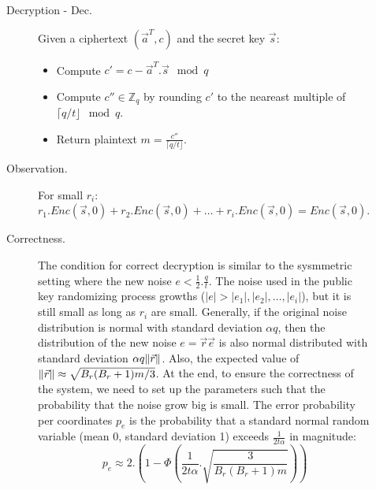\begin{description}
\begin{description}
\[                    \]
                \item [Decryption - Dec.] Given a ciphertext $(\vec{a}^T, c)$
                    and the secret key $\vec{s}$:
                    \begin{itemize}
                        \item Compute $c' = c - \vec{a}^T . \vec{s} \mod q$
                        \item Compute $c''  \in \mathbb{Z}_q$ by rounding
                            $c'$ to the neareast multiple of $\lceil q/t
                            \rfloor \mod q$.
                        \item Return plaintext $m = \frac{c''}{\lceil q/t
                            \rfloor}$.
                    \end{itemize}
                \item [Observation.] For small $r_i$: $r_1.Enc(\vec{s},0) +
                    r_2.Enc(\vec{s}, 0) + \dots + r_i.Enc(\vec{s},0) =
                    Enc(\vec{s}, 0)$.
                \item [Correctness.] The condition for correct decryption is
                    similar to the sysmmetric setting where the new noise
                    $e < \frac{1}{2}. \frac{q}{t}$. The noise used in the
                    public key randomizing process
                    growths ($|e| > |e_1|, |e_2|,\dots,|e_i|$), but it is still small as long
                    as $r_i$ are small. Generally, if the original noise
                    distribution is normal with standard deviation $\alpha q$,
                    then the distribution of the new noise $e =
                    \vec{r}\vec{e}$ is also normal
                    distributed with standard deviation $\alpha q
                    \Vert \vec{r} \Vert$. Also, the expected value of
                    $\Vert \vec{r} \Vert \approx \sqrt{B_r(B_r + 1)m/3}$. At the end,
                    to ensure the correctness of the system,
                    we need to set up the parameters such that the
                    probability that the noise grow big is small. The error
                    probability per coordinates $p_e$ is the probability that a
                    standard normal random variable (mean 0, standard deviation
                    1) exceeds $\frac{1}{2t\alpha}$ in magnitude:
                    \[
                        p_e \approx 2 . \left( 1 - \Phi\left(
                            \frac{1}{2t\alpha}.\sqrt{\frac{3}{B_r(B_r+1)m}} \right)
                    \right)
                    \]

\end{description}
\end{description}
